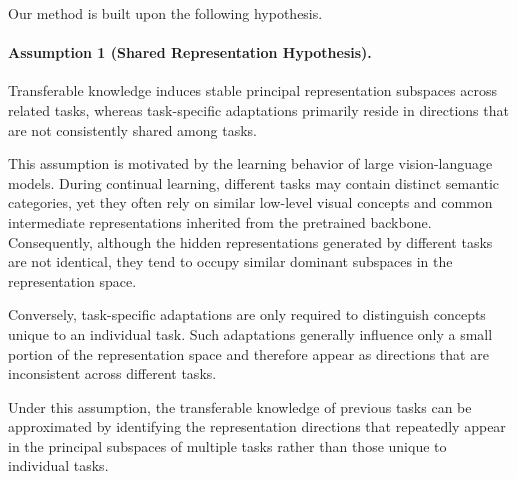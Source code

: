 \documentclass[a4paper]{article}
\begin{document}
Our method is built upon the following hypothesis.

\paragraph{Assumption 1 (Shared Representation Hypothesis).}
Transferable knowledge induces stable principal representation subspaces across related tasks, whereas task-specific adaptations primarily reside in directions that are not consistently shared among tasks.

This assumption is motivated by the learning behavior of large vision-language models. During continual learning, different tasks may contain distinct semantic categories, yet they often rely on similar low-level visual concepts and common intermediate representations inherited from the pretrained backbone. Consequently, although the hidden representations generated by different tasks are not identical, they tend to occupy similar dominant subspaces in the representation space.

Conversely, task-specific adaptations are only required to distinguish concepts unique to an individual task. Such adaptations generally influence only a small portion of the representation space and therefore appear as directions that are inconsistent across different tasks.

Under this assumption, the transferable knowledge of previous tasks can be approximated by identifying the representation directions that repeatedly appear in the principal subspaces of multiple tasks rather than those unique to individual tasks.
\end{document}

